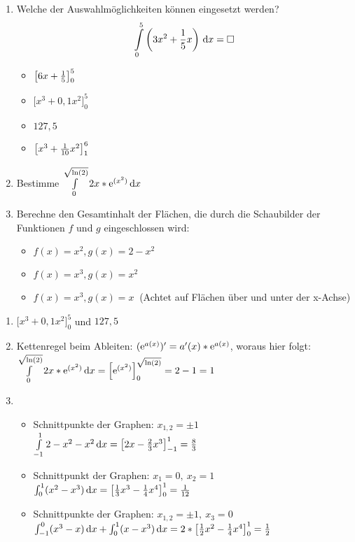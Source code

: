 \begin{enumerate}
	\item Welche der Auswahlmöglichkeiten können eingesetzt werden?
	\begin{equation*}
		\int\limits_0^5 \left(3x^2+ \frac 1 5 x\right)  \,\mathrm{d} x = \Box
	\end{equation*}
  \begin{multicols}{4}
    \begin{itemize}
      \item $\left[ 6x + \frac{1}{5} \right]_0^5$
      \item $\bigg[x^3 + 0,1 x^2\bigg]_0^5$
  		\item $127,5$
      \item $\left[ x^3 + \frac{1}{10} x^2 \right]_1^6$
  	\end{itemize}
  \end{multicols}


	\item Bestimme $\int\limits_0^{\sqrt{\ln(2)}} 2x*\mathrm{e}^{(x^2)} \,\mathrm{d} x$
  \item Berechne den Gesamtinhalt der Flächen, die durch die Schaubilder der Funktionen $f$ und $g$ eingeschlossen wird:
  \begin{itemize}
    \item $f(x)=x^2, g(x)=2-x^2$
    \item $f(x)=x^3, g(x)=x^2$
    \item $f(x)=x^3, g(x)=x\ $ (Achtet auf Flächen über und unter der x-Achse)
  \end{itemize}
\end{enumerate}
\begin{lsg}{}
  \begin{enumerate}
    \item $\bigg[x^3 + 0,1 x^2\bigg]_0^5$ und $127,5$
    \item Kettenregel beim Ableiten: $(\mathrm{e}^{a(x)})'=a'(x)*\mathrm{e}^{a(x)}$, woraus hier folgt:\\ $\int\limits_0^{\sqrt{\ln(2)}} 2x*\mathrm{e}^{(x^2)} \,\mathrm{d} x = \left[\mathrm{e}^{(x^2)}\right]_0^{\sqrt{\ln(2)}}=2-1=1$
    \item
    \begin{itemize}
      \item Schnittpunkte der Graphen: $x_{1,2}=\pm 1$\\ $\int\limits_{-1}^1 2-x^2-x^2\,\mathrm{d} x=\left[2x-\frac{2}{3}x^3\right]_{-1}^1=\frac 8 3$
      \item Schnittpunkt der Graphen: $x_1=0,\ x_2=1$ \\$\int_0^1 (x^2-x^3)\,\mathrm{d} x=\left[\frac{1}{3}x^3-\frac{1}{4}x^4\right]_0^1=\frac 1 {12}$
      \item Schnittpunkte der Graphen: $x_{1,2}=\pm 1,\ x_3=0$ \\$\int_{-1}^0 (x^3-x)\,\mathrm{d} x+\int_0^1 (x-x^3)\,\mathrm{d} x=2*\left[\frac{1}{2}x^2-\frac{1}{4}x^4\right]_0^1=\frac 1 2$
    \end{itemize}
  \end{enumerate}
\end{lsg}




